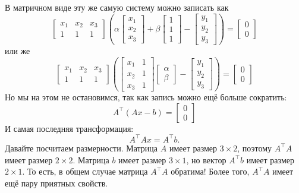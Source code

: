 \documentclass[notitlepage]{report}
\begin{document}
В матричном виде эту же самую систему можно записать как
$$
\begin{bmatrix}x_1 & x_2 & x_3 \\ 1 & 1 & 1 \end{bmatrix}
\left(\alpha \begin{bmatrix}x_1  \\ x_2 \\x_3  \end{bmatrix}
+\beta \begin{bmatrix}1 \\ 1 \\1 \end{bmatrix} - 
\begin{bmatrix}y_1\\y_2\\y_3\end{bmatrix}\right) = \begin{bmatrix}0\\0\end{bmatrix}
$$
или же
$$
\begin{bmatrix}x_1 & x_2 & x_3 \\ 1 & 1 & 1 \end{bmatrix}
\left(
\begin{bmatrix}x_1  & 1 \\ x_2 & 1 \\x_3 & 1 \end{bmatrix}
\begin{bmatrix} \alpha \\ \beta \end{bmatrix}-
\begin{bmatrix} y_1 \\ y_2 \\ y_3 \end{bmatrix}
\right) = \begin{bmatrix}0\\0\end{bmatrix}
$$
Но мы на этом не остановимся, так как запись можно ещё больше сократить:
$$
A^\top (Ax - b)= \begin{bmatrix}0\\0\end{bmatrix}
$$
И самая последняя трансформация:
$$
A^\top Ax = A^\top b.
$$
Давайте посчитаем размерности. Матрица $A$ имеет размер $3\times 2$, поэтому $A^\top A$ имеет размер $2\times 2$. Матрица $b$ имеет размер $3\times 1$, но вектор $A^\top b$ имеет размер $2\times 1$.
То есть, в общем случае матрица $A^\top A$ обратима! Более того, $A^\top A$ имеет ещё пару приятных свойств.
\end{document}
